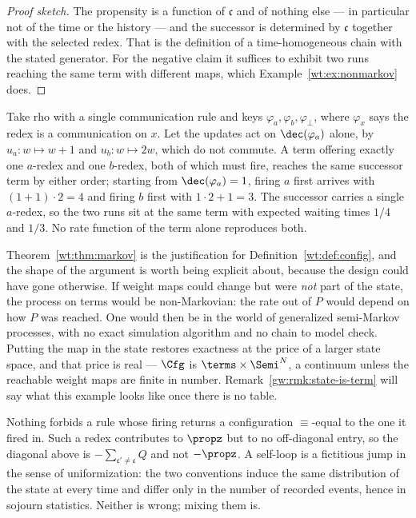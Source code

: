 \begin{proof}[Proof sketch]
The propensity is a function of $\mathfrak{c}$ and of nothing else --- in particular not
of the time or the history --- and the successor is determined by $\mathfrak{c}$ together
with the selected redex. That is the definition of a time-homogeneous chain with the
stated generator. For the negative claim it suffices to exhibit two runs reaching the same
term with different maps, which Example~\ref{wt:ex:nonmarkov} does.
\end{proof}

\begin{example}
\label{wt:ex:nonmarkov}
Take rho with a single communication rule and keys $\varphi_a, \varphi_b, \varphi_{\bot}$,
where $\varphi_x$ says the redex is a communication on $x$. Let the updates act on
$\dec(\varphi_a)$ alone, by $u_a : w \mapsto w+1$ and $u_b : w \mapsto 2w$, which do not
commute. A term offering exactly one $a$-redex and one $b$-redex, both of which must fire,
reaches the same successor term by either order; starting from $\dec(\varphi_a) = 1$,
firing $a$ first arrives with $(1+1)\cdot 2 = 4$ and firing $b$ first with
$1\cdot 2 + 1 = 3$. The successor carries a single $a$-redex, so the two runs sit at the
same term with expected waiting times $1/4$ and $1/3$. No rate function of the term alone
reproduces both.
\end{example}

Theorem~\ref{wt:thm:markov} is the justification for
Definition~\ref{wt:def:config}, and the shape of the argument is worth being explicit
about, because the design could have gone otherwise. If weight maps could change but were
\emph{not} part of the state, the process on terms would be non-Markovian: the rate out of
$P$ would depend on how $P$ was reached. One would then be in the world of generalized
semi-Markov processes, with no exact simulation algorithm and no chain to model check.
Putting the map in the state restores exactness at the price of a larger state space, and
that price is real --- $\Cfg$ is $\terms \times \Semi^N$, a continuum unless the reachable
weight maps are finite in number. Remark~\ref{gw:rmk:state-is-term} will say what this
example looks like once there is no table.

\begin{remark}
\label{wt:rmk:selfloop}
Nothing forbids a rule whose firing returns a configuration $\equiv$-equal to the one it
fired in. Such a redex contributes to $\propz$ but to no off-diagonal entry, so the
diagonal above is $-\sum_{\mathfrak{c}' \neq \mathfrak{c}} Q$ and not $-\propz$. A
self-loop is a fictitious jump in the sense of uniformization: the two conventions induce
the same distribution of the state at every time and differ only in the number of recorded
events, hence in sojourn statistics. Neither is wrong; mixing them is.
\end{remark}

